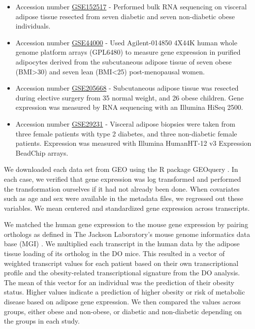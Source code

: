 \documentclass[
]{article}
\begin{document}
\begin{itemize}
\item
  Accession number
  \href{https://www.ncbi.nlm.nih.gov/geo/query/acc.cgi?acc=GSE152517}{GSE152517}
  - Performed bulk RNA sequencing on visceral adipose tissue resected
  from seven diabetic and seven non-diabetic obese individuals.
\item
  Accession number
  \href{https://www.ncbi.nlm.nih.gov/geo/query/acc.cgi?acc=GSE44000}{GSE44000}
  - Used Agilent-014850 4X44K human whole genome platform arrays
  (GPL6480) to measure gene expression in purified adipocytes derived
  from the subcutaneous adipose tissue of seven obese
  (BMI\textgreater30) and seven lean (BMI\textless25) post-menopausal
  women.
\item
  Accession number
  \href{https://www.ncbi.nlm.nih.gov/geo/query/acc.cgi?acc=GSE205668}{GSE205668}
  - Subcutaneous adipose tissue was resected during elective surgery
  from 35 normal weight, and 26 obese children. Gene expression was
  measured by RNA sequencing with an Illumina HiSeq 2500.
\item
  Accession number
  \href{https://www.ncbi.nlm.nih.gov/geo/query/acc.cgi?acc=GSE29231}{GSE29231}
  - Visceral adipose biopsies were taken from three female patients with
  type 2 diabetes, and three non-diabetic female patients. Expression
  was measured with Illumina HumanHT-12 v3 Expression BeadChip arrays.
\end{itemize}

We downloaded each data set from GEO using the R package GEOquery
\cite{geoquery}. In each case, we verified that gene expression was log
transformed and performed the transformation ourselves if it had not
already been done. When covariates such as age and sex were available in
the metadata files, we regressed out these variables. We mean centered
and standardized gene expression across transcripts.

We matched the human gene expression to the mouse gene expression by
pairing orthologs as defined in The Jackson Laboratory's mouse genome
informatics data base (MGI) \cite{pmid38531069}. We multiplied each
transcript in the human data by the adipose tissue loading of its
ortholog in the DO mice. This resulted in a vector of weighted
transcript values for each patient based on their own transcriptional
profile and the obesity-related transcriptional signature from the DO
analysis. The mean of this vector for an individual was the prediction
of their obesity status. Higher values indicate a prediction of higher
obesity or risk of metabolic disease based on adipose gene expression.
We then compared the values across groups, either obese and non-obese,
or diabetic and non-diabetic depending on the groups in each study.
\end{document}
